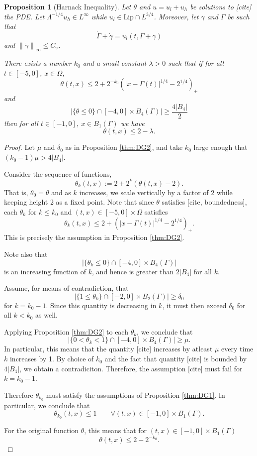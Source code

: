 \documentclass[11pt]{amsart}
\newtheorem{proposition}[theorem]{Proposition}
\theoremstyle{remark}
\theoremstyle{definition}
\newcommand{\norm}[1]{\left\lVert#1\right\rVert}
\newcommand{\paren}[1]{\left( #1 \right)}
\newcommand{\abs}[1]{\left\lvert #1 \right\rvert}
\newcommand{\Lip}{\text{Lip}}
\newcommand{\ulow}{u_l}
\newcommand{\uhigh}{u_h}
\begin{document}
\begin{proposition}[Harnack Inequality] \label{thm:harnack general}
Let $\theta$ and $u = \ulow + \uhigh$ be solutions to [cite] the PDE.  Let $\Lambda^{-1/4} \uhigh \in L^\infty$ while $\ulow \in \Lip \cap L^{3/4}$.  Moreover, let $\gamma$ and $\Gamma$ be such that
\[ \dot{\Gamma} + \dot{\gamma} = \ulow(t,\Gamma+\gamma) \]
and $\norm{\dot{\gamma}}_\infty \leq C_\gamma$. 

There exists a number $k_0$ and a small constant $\lambda>0$ such that if for all $t \in [-5,0]$, $x \in \Omega$,
\[ \theta(t,x) \leq 2 + 2^{-k_0} \paren{|x-\Gamma(t)|^{1/4}-2^{1/4}}_+ \]
and
\[ \abs{\{\theta \leq 0\} \cap [-4,0]\times B_4(\Gamma)} \geq \frac{4|B_4|}{2} \]
then for all $t \in [-1,0]$, $x \in B_1(\Gamma)$ we have
\[ \theta(t,x) \leq 2 - \lambda. \]
\end{proposition}

\begin{proof}
Let $\mu$ and $\delta_0$ as in Proposition \ref{thm:DG2}, and take $k_0$ large enough that $(k_0-1) \mu > 4 |B_4|$.  

Consider the sequence of functions,
\[ \theta_k(t,x) := 2 + 2^k (\theta(t,x) - 2). \]
That is, $\theta_0 = \theta$ and as $k$ increases, we scale vertically by a factor of 2 while keeping height 2 as a fixed point.  Note that since $\theta$ satisfies [cite, boundedness], each $\theta_k$ for $k \leq k_0$ and $(t,x) \in [-5,0] \times \Omega$ satisfies
\[ \theta_k(t,x) \leq 2 + \paren{|x-\Gamma(t)|^{1/4}-2^{1/4}}_+. \]
This is precisely the assumption in Proposition \ref{thm:DG2}.  

Note also that
\[ \abs{\{\theta_k \leq 0\} \cap [-4,0]\times B_4(\Gamma)} \]
is an increasing function of $k$, and hence is greater than $2|B_4|$ for all $k$.  

Assume, for means of contradiction, that
\[ \abs{\{1 \leq \theta_k \} \cap [-2,0]\times B_2(\Gamma)} \geq \delta_0 \]
for $k = k_0-1$.  Since this quantity is decreasing in $k$, it must then exceed $\delta_0$ for all $ k < k_0$ as well.  

Applying Proposition \ref{thm:DG2} to each $\theta_k$, we conclude that 
\[ \abs{\{0 < \theta_k < 1\} \cap [-4,0]\times B_4(\Gamma)} \geq \mu. \]
In particular, this means that the quantity [cite] increases by atleast $\mu$ every time $k$ increases by 1. By choice of $k_0$ and the fact that quantity [cite] is bounded by $4|B_4|$, we obtain a contradiciton.  Therefore, the assumption [cite] must fail for $k = k_0-1$.  

Therefore $\theta_{k_0}$ must satisfy the assumptions of Proposition \ref{thm:DG1}.  In particular, we conclude that
\[ \theta_{k_0}(t,x) \leq 1 \qquad \forall (t,x) \in [-1,0]\times B_1(\Gamma). \]

For the original function $\theta$, this means that for $(t,x) \in [-1,0] \times B_1(\Gamma)$
\[ \theta(t,x) \leq 2 - 2^{-k_0}. \]
\end{proof}
\end{document}

